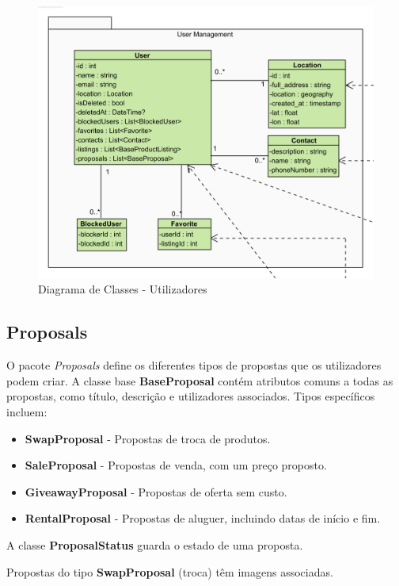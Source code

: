 \documentclass[a4paper, 12pt]{article} %
\begin{document}
\begin{figure}[ht]
	\centering
	\includegraphics[width=\textwidth]{../images/class-diagram-user-management.png}
	\caption{Diagrama de Classes - Utilizadores}
	\label{fig:class_diagram_user_management}
\end{figure}

\subsection{Proposals}
O pacote \textit{Proposals} define os diferentes tipos de propostas que os utilizadores podem criar. A classe base \textbf{BaseProposal} contém atributos comuns a todas as propostas, como título, descrição e utilizadores associados. Tipos específicos incluem:
\begin{itemize}
	\item \textbf{SwapProposal} - Propostas de troca de produtos.
	\item \textbf{SaleProposal} - Propostas de venda, com um preço proposto.
	\item \textbf{GiveawayProposal} - Propostas de oferta sem custo.
	\item \textbf{RentalProposal} - Propostas de aluguer, incluindo datas de início e fim.
\end{itemize}
A classe \textbf{ProposalStatus} guarda o estado de uma proposta.

Propostas do tipo \textbf{SwapProposal} (troca) têm imagens associadas.
\end{document}
